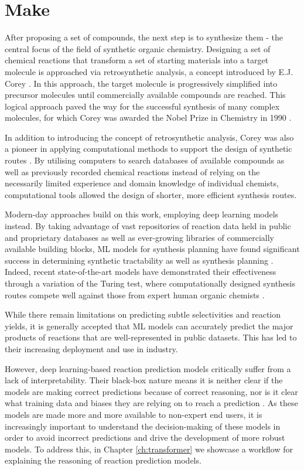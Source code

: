 \section*{Make}
After proposing a set of compounds, the next step is to synthesize them - the central focus of the field of synthetic organic chemistry. Designing a set of chemical reactions that transform a set of starting materials into a target molecule is approached via retrosynthetic analysis, a concept introduced by E.J. Corey \cite{corey1991logic}. In this approach, the target molecule is progressively simplified into precursor molecules until commercially available compounds are reached. This logical approach paved the way for the successful synthesis of many complex molecules, for which Corey was awarded the Nobel Prize in Chemistry in 1990 \cite{NobelCorey}.

In addition to introducing the concept of retrosynthetic analysis, Corey was also a pioneer in applying computational methods to support the design of synthetic routes \cite{Corey1985ComputerAssistedSynthesis}. By utilising computers to search databases of available compounds as well as previously recorded chemical reactions instead of relying on the necessarily limited experience and domain knowledge of individual chemists, computational tools allowed the design of shorter, more efficient synthesis routes.

Modern-day approaches build on this work, employing deep learning models instead. By taking advantage of vast repositories of reaction data held in public and proprietary databases as well as ever-growing libraries of commercially available building blocks, ML models for synthesis planning have found significant success in determining synthetic tractability as well as synthesis planning \cite{Coley2018}. Indeed, recent state-of-the-art models have demonstrated their effectiveness through a variation of the Turing test, where computationally designed synthesis routes compete well against those from expert human organic chemists \cite{Coley19WLDN5}.

While there remain limitations on predicting subtle selectivities and reaction yields, it is generally accepted that ML models can accurately predict the major products of reactions that are well-represented in public datasets. This has led to their increasing deployment and use in industry.

However, deep learning-based reaction prediction models critically suffer from a lack of interpretability. Their black-box nature means it is neither clear if the models are making correct predictions because of correct reasoning, nor is it clear what training data and biases they are relying on to reach a prediction \cite{Jimenze2020XAI}. As these models are made more and more available to non-expert end users, it is increasingly important to understand the decision-making of these models in order to avoid incorrect predictions and drive the development of more robust models. To address this, in Chapter \ref{ch:transformer} we showcase a workflow for explaining the reasoning of reaction prediction models.

